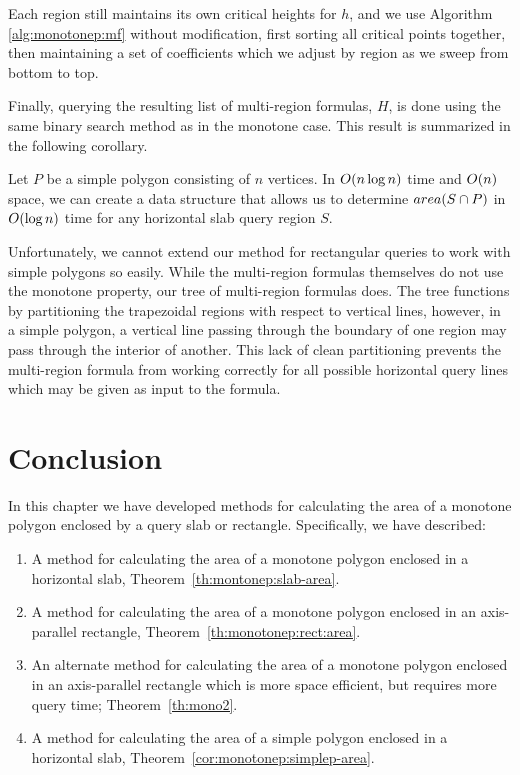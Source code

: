 Each region still maintains its own critical heights for $h$, and we use Algorithm \ref{alg:monotonep:mf} without modification, first sorting all critical points together, then maintaining a set of coefficients which we adjust by region as we sweep from bottom to top.

Finally, querying the resulting list of multi-region formulas, $H$, is done using the same binary search method as in the monotone case. This result is summarized in the following corollary.

\begin{corollary}
\label{cor:monotonep:simplep-area}
Let $P$ be a simple polygon consisting of $n$ vertices. In $O\!\left(n \log{n}\right)$ time and $O\!\left(n\right)$ space, we can create a data structure that allows us to determine $area(S \cap P)$ in $O\!\left(\log{n}\right)$ time for any horizontal slab query region $S$.
\end{corollary}

Unfortunately, we cannot extend our method for rectangular queries to work with simple polygons so easily.
While the multi-region formulas themselves do not use the monotone property, our tree of multi-region formulas does. 
The tree functions by partitioning the trapezoidal regions with respect to vertical lines, however, in a simple polygon, a vertical line passing through the boundary of one region may pass through the interior of another. 
This lack of clean partitioning prevents the multi-region formula from working correctly for all possible horizontal query lines which may be given as input to the formula.

\section{Conclusion}
\label{:monotonep:concl}

In this chapter we have developed methods for calculating the area of a monotone polygon enclosed by a query slab or rectangle.  Specifically, we have described:

\begin{enumerate}
\item A method for calculating the area of a monotone polygon enclosed in a horizontal slab, Theorem~\ref{th:montonep:slab-area}.

\item A method for calculating the area of a monotone polygon enclosed in an axis-parallel rectangle, Theorem~\ref{th:monotonep:rect:area}.

\item An alternate method for calculating the area of a monotone polygon enclosed in an axis-parallel rectangle which is more space efficient, but requires more query time; Theorem~\ref{th:mono2}.

\item A method for calculating the area of a simple polygon enclosed in a horizontal slab, Theorem~\ref{cor:monotonep:simplep-area}.

\end{enumerate}

